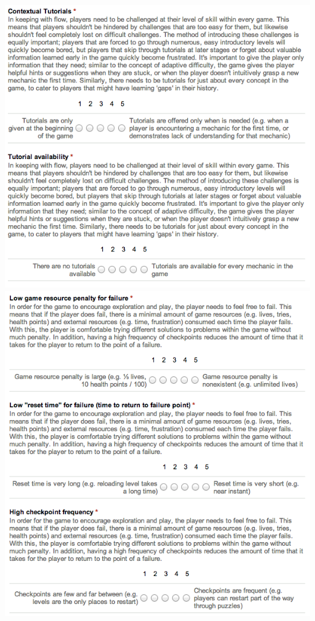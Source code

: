 		\includegraphics[width = \textwidth]{img/survey7.png}
		\includegraphics[width = \textwidth]{img/survey8.png}
